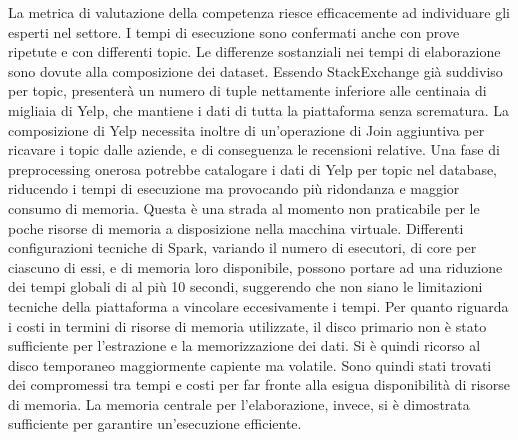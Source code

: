 La metrica di valutazione della competenza riesce efficacemente ad individuare gli esperti nel settore. I tempi di esecuzione sono confermati anche con prove ripetute e con differenti topic. Le differenze sostanziali nei tempi di elaborazione sono dovute alla composizione dei dataset. Essendo StackExchange già suddiviso per topic, presenterà un numero di tuple nettamente inferiore alle centinaia di migliaia di Yelp, che mantiene i dati di tutta la piattaforma senza scrematura. La composizione di Yelp necessita inoltre di un'operazione di Join aggiuntiva per ricavare i topic dalle aziende, e di conseguenza le recensioni relative. Una fase di preprocessing onerosa potrebbe catalogare i dati di Yelp per topic nel database, riducendo i tempi di esecuzione ma provocando più ridondanza e maggior consumo di memoria. Questa è una strada al momento non praticabile per le poche risorse di memoria a disposizione nella macchina virtuale. Differenti configurazioni tecniche di Spark, variando il numero di esecutori, di core per ciascuno di essi, e di memoria loro disponibile, possono portare ad una riduzione dei tempi globali di al più 10 secondi, suggerendo che non siano le limitazioni tecniche della piattaforma a vincolare eccesivamente i tempi. Per quanto riguarda i costi in termini di risorse di memoria utilizzate, il disco primario non è stato sufficiente per l'estrazione e la memorizzazione dei dati. Si è quindi ricorso al disco temporaneo maggiormente capiente ma volatile. Sono quindi stati trovati dei compromessi tra tempi e costi per far fronte alla esigua disponibilità di risorse di memoria. La memoria centrale per l'elaborazione, invece, si è dimostrata sufficiente per garantire un'esecuzione efficiente.